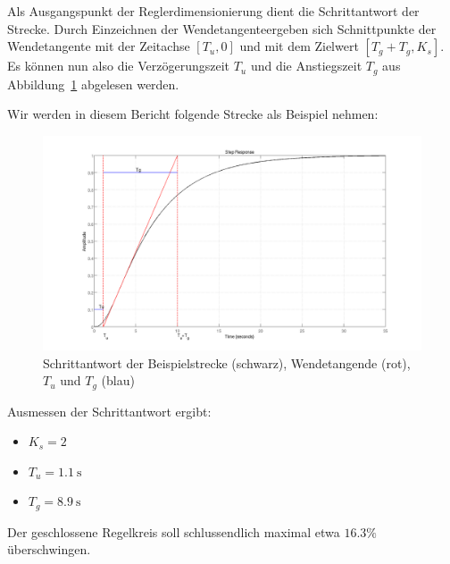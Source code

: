 Als  Ausgangspunkt  der  Reglerdimensionierung dient  die  Schrittantwort  der
Strecke. Durch  Einzeichnen  der  Wendetangente\footnotemark[1]  ergeben  sich
Schnittpunkte  der  Wendetangente mit  der  Zeitachse  $[T_u,0]$ und  mit  dem
Zielwert $[T_g+T_g,K_s]$.   Es k\"onnen nun also  die Verz\"ogerungszeit $T_u$
und  die  Anstiegszeit   $T_g$  aus  Abbildung~\ref{fig:plant_step}  abgelesen
werden.


Wir werden in diesem Bericht folgende Strecke als Beispiel nehmen:
\begin{figure}[h! width=\pagewidth]
    \includegraphics[width=\textwidth]{images/streckeSchrittantwort.png}
    \caption{%
    Schrittantwort der  Beispielstrecke (schwarz), Wendetangende  (rot), $T_u$
    und $T_g$ (blau)
    }
    \label{fig:plant_step}
\end{figure}

Ausmessen der Schrittantwort ergibt:
\begin{itemize}
    \item
        $K_s = 2$\footnotemark[2]
    \item
        $T_u = \SI{1.1}{\second}$
    \item
        $T_g = \SI{8.9}{\second}$
\end{itemize}


Der  geschlossene   Regelkreis  soll  schlussendlich  maximal   etwa  $16.3\%$
\"uberschwingen.

